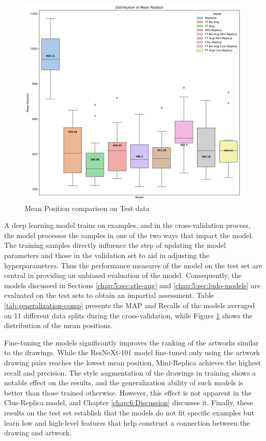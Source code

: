 \begin{figure}
    \centering
    \includegraphics[width=\textwidth]{images/metrics/mp_test_data_500dpi.png}
      \caption{Mean Position comparison on Test data}
      \label{fig:test-data-mp}
\end{figure}

A deep learning model trains on examples, and in the cross-validation process, the model processes the samples in one of the two ways that impact the model. The training samples directly influence the step of updating the model parameters and those in the validation set to aid in adjusting the hyperparameters. Thus the performance measures of the model on the test set are central in providing an unbiased evaluation of the model. Consequently, the models discussed in Sections \ref{chap:5:sec:stle-aug} and \ref{chap:5:sec:ludo-models} are evaluated on the test sets to obtain an impartial assessment. Table \ref{tab:generalization-comp} presents the MAP and Recalls of the models averaged on 11 different data splits during the cross-validation, while Figure \ref{fig:test-data-mp} shows the distribution of the mean positions.

Fine-tuning the models significantly improves the ranking of the artworks similar to the drawings. While the ResNeXt-101 model fine-tuned only using the artwork drawing pairs reaches the lowest mean position, Mini-Replica achieves the highest recall and precision. The style augmentation of the drawings in training shows a notable effect on the results, and the generalization ability of such models is better than those trained otherwise. However, this effect is not apparent in the Clus-Replica model, and Chapter \ref{chap:6:Discussion} discusses it. Finally, these results on the test set establish that the models do not fit specific examples but learn low and high-level features that help construct a connection between the drawing and artwork.
